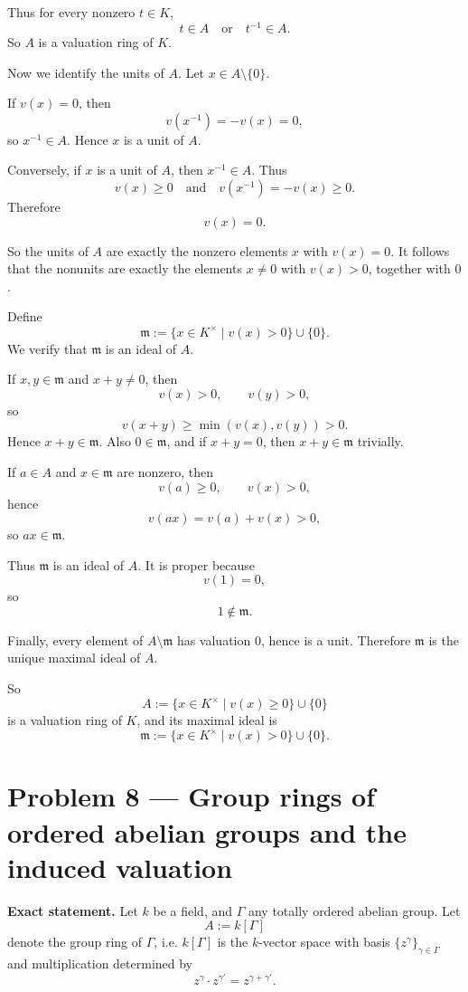 \documentclass[12pt,a4paper]{article}
\theoremstyle{plain}
\theoremstyle{definition}      %
\begin{document}
Thus for every nonzero \(t\in K\),
\[
t\in A \quad\text{or}\quad t^{-1}\in A.
\]
So \(A\) is a valuation ring of \(K\).

\medskip

Now we identify the units of \(A\). Let \(x\in A\setminus\{0\}\).

If \(v(x)=0\), then
\[
v(x^{-1})=-v(x)=0,
\]
so \(x^{-1}\in A\). Hence \(x\) is a unit of \(A\).

Conversely, if \(x\) is a unit of \(A\), then \(x^{-1}\in A\). Thus
\[
v(x)\ge 0
\quad\text{and}\quad
v(x^{-1})=-v(x)\ge 0.
\]
Therefore
\[
v(x)=0.
\]

So the units of \(A\) are exactly the nonzero elements \(x\) with \(v(x)=0\). It follows that the nonunits are exactly the elements \(x\neq 0\) with \(v(x)>0\), together with \(0\).

Define
\[
\mathfrak m:=\{x\in K^\times\mid v(x)>0\}\cup\{0\}.
\]
We verify that \(\mathfrak m\) is an ideal of \(A\).

If \(x,y\in \mathfrak m\) and \(x+y\neq 0\), then
\[
v(x)>0,\qquad v(y)>0,
\]
so
\[
v(x+y)\ge \min(v(x),v(y))>0.
\]
Hence \(x+y\in \mathfrak m\). Also \(0\in \mathfrak m\), and if \(x+y=0\), then \(x+y\in \mathfrak m\) trivially.

If \(a\in A\) and \(x\in \mathfrak m\) are nonzero, then
\[
v(a)\ge 0,\qquad v(x)>0,
\]
hence
\[
v(ax)=v(a)+v(x)>0,
\]
so \(ax\in \mathfrak m\).

Thus \(\mathfrak m\) is an ideal of \(A\). It is proper because
\[
v(1)=0,
\]
so
\[
1\notin \mathfrak m.
\]

Finally, every element of \(A\setminus \mathfrak m\) has valuation \(0\), hence is a unit. Therefore \(\mathfrak m\) is the unique maximal ideal of \(A\).

So
\[
A:=\{x\in K^\times\mid v(x)\ge 0\}\cup\{0\}
\]
is a valuation ring of \(K\), and its maximal ideal is
\[
\mathfrak m:=\{x\in K^\times\mid v(x)>0\}\cup\{0\}.
\]
	
\section*{Problem 8 --- Group rings of ordered abelian groups and the induced valuation}

\textbf{Exact statement.}
Let \(k\) be a field, and \(\Gamma\) any totally ordered abelian group. Let
\[
A:=k[\Gamma]
\]
denote the group ring of \(\Gamma\), i.e. \(k[\Gamma]\) is the \(k\)-vector space with basis \(\{z^\gamma\}_{\gamma\in\Gamma}\) and multiplication determined by
\[
z^\gamma\cdot z^{\gamma'}=z^{\gamma+\gamma'}.
\]
\end{document}
